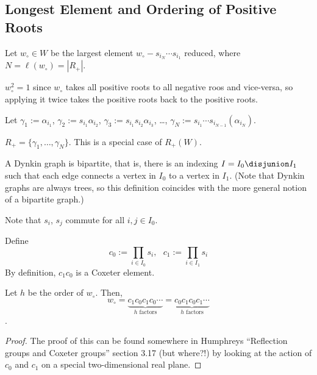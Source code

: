 \documentclass[11pt,leqno,oneside]{amsbook}
\numberwithin{thm}{section}
\newcommand{\roots}{R} %
\begin{document}
\subsection{Longest Element and Ordering of Positive Roots}
\begin{defn}
  Let \(w_\circ \in W\) be the largest element \(w_\circ - s_{i_N}
  \cdots s_{i_1}\) reduced, where \(N = \ell(w_\circ) = |\roots_+|\). 
\end{defn}
\begin{rmk}
    \(w_\circ^2 = 1\) since \(w_\circ\) takes all positive roots to
    all negative roos and vice-versa, so applying it twice takes the
    positive roots back to the positive roots. 
\end{rmk}
\begin{defn}
  Let \(\gamma_1 := \alpha_{i_1}\), \(\gamma_2 := s_{i_1}
  \alpha_{i_2}\), \(\gamma_3 := s_{i_1} s_{i_2} \alpha_{i_3}\), \ldots,
  \(\gamma_N := s_{i_1} \cdots s_{i_{N-1}}(\alpha_{i_N})\).
\end{defn}
\begin{prop}
  \(\roots_+ = \{\gamma_1, \ldots, \gamma_N\}\). This is a special case of
  \(\roots_+(W)\). 
\end{prop}
\begin{prop}
  A Dynkin graph is bipartite, that is, there is an indexing \(I = I_0
  \disjunion I_1\) such that each edge connects a vertex in \(I_0\) to
  a vertex in \(I_1\). (Note that Dynkin graphs are always trees, so
  this definition coincides with the more general notion of a
  bipartite graph.)
\end{prop}
\begin{rmk}
  Note that \(s_i\), \(s_j\) commute for all \(i,j \in I_0\).
\end{rmk}
\begin{defn}
  Define \[
    c_0 := \prod_{i \in I_0} s_i, \ \ \ c_1 := \prod_{i \in I_1} s_i
  \]
  By definition, \(c_1 c_0\) is a Coxeter element.
\end{defn}
\begin{prop}
  Let \(h\) be the order of \(w_\circ\). Then, \[
w_\circ =
  \underbrace{c_1 c_0 c_1 c_0 \cdots}_{h \text{ factors}} =
  \underbrace{c_0 c_1 c_0 c_1 \cdots}_{h \text{ factors}}
  \].
\end{prop}
\begin{proof}
  The proof of this can be found somewhere in Humphreys ``Reflection
  groups and Coxeter groups'' section 3.17 (but
  where?!) by looking at the action of \(c_0\) and \(c_1\) on a
  special two-dimensional real plane.
\end{proof}
\end{document}
